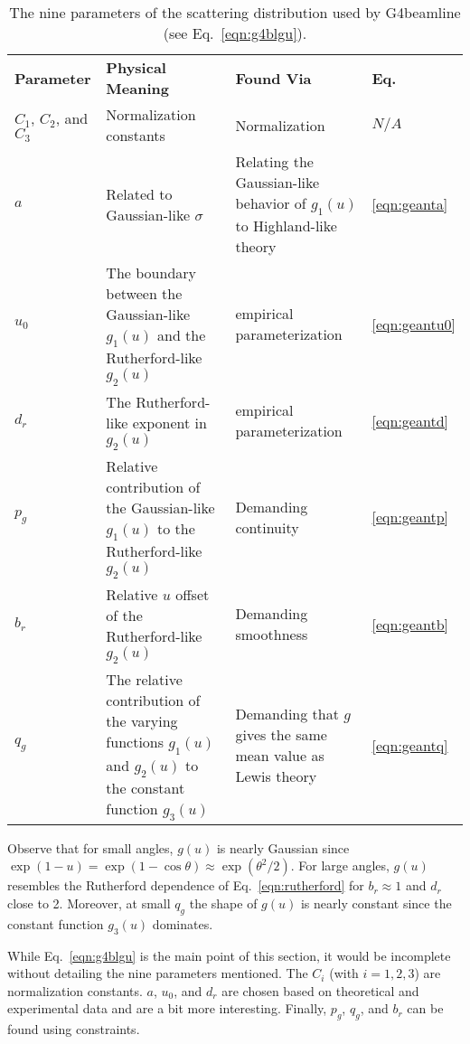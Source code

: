 \begin{table}
\caption[G4beamline scattering distribution parameters.]{The nine parameters of the scattering distribution used by G4beamline (see Eq.~\eqref{eqn:g4blgu}).}
\begin{tabularx}{\textwidth}{A B B C}
\hline \hline
	\textbf{Parameter} & \textbf{Physical Meaning} & \textbf{Found Via} & \textbf{Eq.} \\
	$C_1$, $C_2$, and $C_3$ & Normalization constants & Normalization & $N/A$ \\
	$a$ & Related to Gaussian-like $\sigma$ & Relating the Gaussian-like behavior of $g_1(u)$ to Highland-like theory \cite{highland} & \ref{eqn:geanta} \\
	$u_0$ & The boundary between the Gaussian-like $g_1(u)$ and the Rutherford-like $g_2(u)$ & empirical parameterization & \ref{eqn:geantu0} \\
	$d_r$ & The Rutherford-like exponent in $g_2(u)$ & empirical parameterization & \ref{eqn:geantd} \\
	$p_g$ & Relative contribution of the Gaussian-like $g_1(u)$ to the Rutherford-like $g_2(u)$ & Demanding continuity & \ref{eqn:geantp} \\
	$b_r$ & Relative $u$ offset of the Rutherford-like $g_2(u)$ & Demanding smoothness & \ref{eqn:geantb} \\
	$q_g$ & The relative contribution of the varying functions $g_1(u)$ and $g_2(u)$ to the constant function $g_3(u)$ & Demanding that $g$ gives the same mean value as Lewis theory & \ref{eqn:geantq}\\
\hline
\end{tabularx}
\label{tbl:g4blgu_parameters}
\end{table}


Observe that for small angles, $g(u)$ is nearly Gaussian since $\exp{(1-u)}=\exp{(1-\cos\theta)}\approx\exp{(\theta^2/2)}$. For large angles, $g(u)$ resembles the Rutherford dependence of Eq.~\eqref{eqn:rutherford} for $b_r\approx 1$ and $d_r$ close to 2. Moreover, at small $q_g$ the shape of $g(u)$ is nearly constant since the constant function $g_3(u)$ dominates.

While Eq.~\eqref{eqn:g4blgu} is the main point of this section, it would be incomplete without detailing the nine parameters mentioned. The $C_i$ (with $i=1,2,3$) are normalization constants. $a$, $u_0$, and $d_r$ are chosen based on theoretical and experimental data and are a bit more interesting. Finally, $p_g$, $q_g$, and $b_r$ can be found using constraints. 

